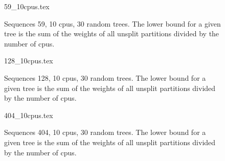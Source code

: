 \documentclass[12pt,a4paper]{article}
\begin{document}
 
\begin{figure}
\caption*{Sequences 59, 10 cpus, 30 random trees. The lower bound for a given tree is the sum of the weights of all unsplit partitions divided by the number of cpus.}
{59_10cpus.tex}
\end{figure}

 
\begin{figure}
\caption*{Sequences 128, 10 cpus, 30 random trees. The lower bound for a given tree is the sum of the weights of all unsplit partitions divided by the number of cpus.}
{128_10cpus.tex}
\end{figure}

 
\begin{figure}
\caption*{Sequences 404, 10 cpus, 30 random trees. The lower bound for a given tree is the sum of the weights of all unsplit partitions divided by the number of cpus.}
{404_10cpus.tex}
\end{figure}
\end{document}
